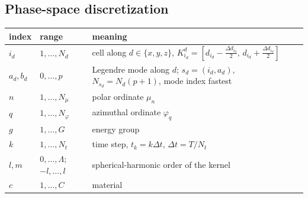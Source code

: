 \documentclass[11pt,a4paper]{article}
\newcommand{\Lmax}{\Lambda}
\begin{document}
\subsection{Phase-space discretization}
\label{sec:discretization}

\begin{center}\small
\begin{tabular}{@{}lll@{}}
\toprule
index & range & meaning\\
\midrule
$i_d$ & $1,\dots,N_d$ & cell along $d\in\{x,y,z\}$, $K^d_{i_d}=[d_{i_d}-\tfrac{\Delta d_{i_d}}2,\,d_{i_d}+\tfrac{\Delta d_{i_d}}2]$\\
$a_d,b_d$ & $0,\dots,p$ & Legendre mode along $d$; $s_d=(i_d,a_d)$, $N_{s_d}=N_d(p+1)$, mode index fastest\\
$n$ & $1,\dots,N_\mu$ & polar ordinate $\mu_n$\\
$q$ & $1,\dots,N_\varphi$ & azimuthal ordinate $\varphi_q$\\
$g$ & $1,\dots,G$ & energy group\\
$k$ & $1,\dots,N_t$ & time step, $t_k=k\Delta t$, $\Delta t=T/N_t$\\
$l,m$ & $0,\dots,\Lmax$; $-l,\dots,l$ & spherical-harmonic order of the kernel\\
$c$ & $1,\dots,C$ & material\\
\bottomrule
\end{tabular}
\end{center}
\end{document}
